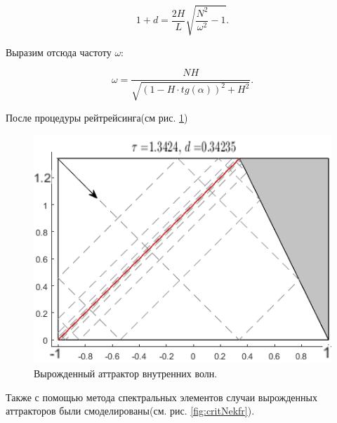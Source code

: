 \begin{equation}
    1+d=\frac{2H}{L} \sqrt{\frac{N^2}{\omega^2}-1}.
\end{equation}

Выразим отсюда частоту $\omega$:

\begin{equation}
    \omega = \frac{NH}{\sqrt{\left( 1-H\cdot tg(\alpha) \right)^2+H^2}}.
\end{equation}

После процедуры рейтрейсинга(см рис. \ref{fig:attrTriv})
    
\begin{figure}
    \centering
    \includegraphics[scale=0.6]{Figs/AttrCritFreq.png}
    \caption{Вырожденный аттрактор внутренних волн.}
    \label{fig:attrTriv}
\end{figure}


Также с помощью метода спектральных элементов случаи вырожденных аттракторов были смоделированы(см. рис. \ref{fig:critNekfr}).

